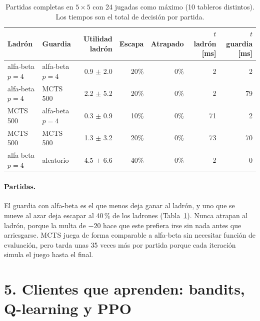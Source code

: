 \begin{table}[H]\centering\footnotesize\setlength{\tabcolsep}{4pt}
\begin{tabular}{llrrrrr}\toprule
Ladrón & Guardia & Utilidad ladrón & Escapa & Atrapado & $t$ ladrón [ms] & $t$ guardia [ms]\\\midrule
alfa-beta $p=4$ & alfa-beta $p=4$ & 0.9 $\pm$ 2.0 & 20\% & 0\% & 2 & 2 \\
alfa-beta $p=4$ & MCTS 500 & 2.2 $\pm$ 5.2 & 20\% & 0\% & 2 & 79 \\
MCTS 500 & alfa-beta $p=4$ & 0.3 $\pm$ 0.9 & 10\% & 0\% & 71 & 2 \\
MCTS 500 & MCTS 500 & 1.3 $\pm$ 3.2 & 20\% & 0\% & 73 & 70 \\
alfa-beta $p=4$ & aleatorio & 4.5 $\pm$ 6.6 & 40\% & 0\% & 2 & 0 \\\bottomrule
\end{tabular}
\caption{Partidas completas en $5\times5$ con 24 jugadas como máximo (10 tableros distintos). Los tiempos son el total de decisión por partida.}
\label{p2:tab:partidas}
\end{table}

\paragraph{Partidas.} El guardia con alfa-beta es el que menos deja ganar al ladrón, y uno que se mueve al azar deja escapar al 40\,\% de los ladrones (Tabla~\ref{p2:tab:partidas}). Nunca atrapan al ladrón, porque la multa de $-20$ hace que este prefiera irse sin nada antes que arriesgarse. MCTS juega de forma comparable a alfa-beta sin necesitar función de evaluación, pero tarda unas 35 veces más por partida porque cada iteración simula el juego hasta el final.

\section*{5. Clientes que aprenden: bandits, Q-learning y PPO}
\label{p2:sec:p5}


